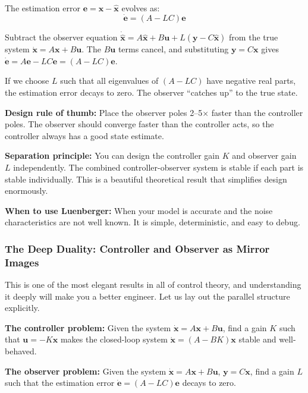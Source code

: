 The estimation error $\mathbf{e} = \mathbf{x} - \hat{\mathbf{x}}$ evolves as:
\begin{equation}
\dot{\mathbf{e}} = (A - LC)\mathbf{e}
\end{equation}

Subtract the observer equation $\dot{\hat{\mathbf{x}}} = A\hat{\mathbf{x}} + B\mathbf{u} + L(\mathbf{y} - C\hat{\mathbf{x}})$ from the true system $\dot{\mathbf{x}} = A\mathbf{x} + B\mathbf{u}$. The $B\mathbf{u}$ terms cancel, and substituting $\mathbf{y} = C\mathbf{x}$ gives $\dot{\mathbf{e}} = A\mathbf{e} - LC\mathbf{e} = (A - LC)\mathbf{e}$.

If we choose $L$ such that all eigenvalues of $(A - LC)$ have negative real parts, the estimation error decays to zero. The observer ``catches up'' to the true state.

\textbf{Design rule of thumb:} Place the observer poles 2--5$\times$ faster than the controller poles. The observer should converge faster than the controller acts, so the controller always has a good state estimate.

\textbf{Separation principle:} You can design the controller gain $K$ and observer gain $L$ independently. The combined controller-observer system is stable if each part is stable individually. This is a beautiful theoretical result that simplifies design enormously.

\textbf{When to use Luenberger:} When your model is accurate and the noise characteristics are not well known. It is simple, deterministic, and easy to debug.

\subsubsection{The Deep Duality: Controller and Observer as Mirror Images}

This is one of the most elegant results in all of control theory, and understanding it deeply will make you a better engineer. Let us lay out the parallel structure explicitly.

\textbf{The controller problem:} Given the system $\dot{\mathbf{x}} = A\mathbf{x} + B\mathbf{u}$, find a gain $K$ such that $\mathbf{u} = -K\mathbf{x}$ makes the closed-loop system $\dot{\mathbf{x}} = (A - BK)\mathbf{x}$ stable and well-behaved.

\textbf{The observer problem:} Given the system $\dot{\mathbf{x}} = A\mathbf{x} + B\mathbf{u}$, $\mathbf{y} = C\mathbf{x}$, find a gain $L$ such that the estimation error $\dot{\mathbf{e}} = (A - LC)\mathbf{e}$ decays to zero.

